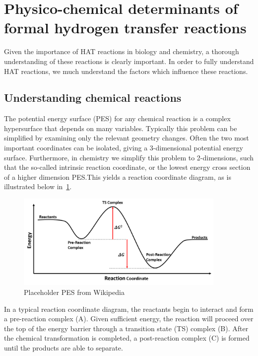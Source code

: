 \newpage

\section{Physico-chemical determinants of formal hydrogen transfer reactions}

Given the importance of HAT reactions in biology and chemistry, a thorough
understanding of these reactions is clearly important. In order to fully
understand HAT reactions, we much understand the factors which influence these
reactions.

\subsection{Understanding chemical reactions}

The potential energy surface (PES) for any chemical reaction is a complex
hypersurface that depends on many variables. Typically this problem can be
simplified by examining only the relevant geometry changes. Often the two most
important coordinates can be isolated, giving a 3-dimensional potential energy
surface. Furthermore, in chemistry we simplify this problem to 2-dimensions,
such that the so-called intrinsic reaction coordinate, or the lowest energy
cross section of a higher dimension PES.\@ This yields a reaction coordinate
diagram, as is illustrated below in~\ref{fig:pes}.

\begin{figure}[htb]
  \centering
  \includegraphics[width=0.9\textwidth]{figures/pes}
  \caption{Placeholder PES from Wikipedia}
\label{fig:pes}
\end{figure}

\noindent In a typical reaction coordinate diagram, the reactants begin to
interact and form a pre-reaction complex (A). Given sufficient energy, the
reaction will proceed over the top of the energy barrier through a transition
state (TS) complex (B). After the chemical transformation is completed, a
post-reaction complex (C) is formed until the products are able to separate.

